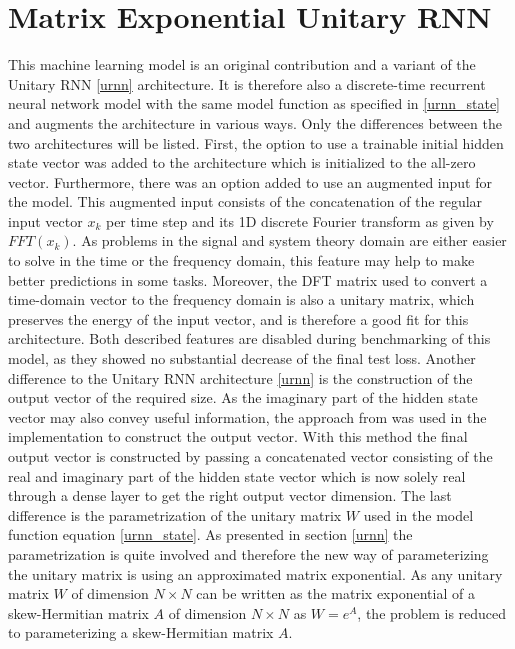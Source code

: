 \documentclass[draft,final]{vutinfth} %
\begin{document}
    \section{Matrix Exponential Unitary RNN} \label{meurnn}
    This machine learning model is an original contribution and a variant of the Unitary RNN \ref{urnn} architecture.
    It is therefore also a discrete-time recurrent neural network model with the same model function as specified in \ref{urnn_state} and augments the architecture in various ways.
    Only the differences between the two architectures will be listed.
    First, the option to use a trainable initial hidden state vector was added to the architecture which is initialized to the all-zero vector.
    Furthermore, there was an option added to use an augmented input for the model.
    This augmented input consists of the concatenation of the regular input vector $x_k$ per time step and its 1D discrete Fourier transform as given by $FFT(x_k)$.
    As problems in the signal and system theory domain are either easier to solve in the time or the frequency domain, this feature may help to make better predictions in some tasks.
    Moreover, the DFT matrix used to convert a time-domain vector to the frequency domain is also a unitary matrix, which preserves the energy of the input vector, and is therefore a good fit for this architecture.
    Both described features are disabled during benchmarking of this model, as they showed no substantial decrease of the final test loss.
    Another difference to the Unitary RNN architecture \ref{urnn} is the construction of the output vector of the required size.
    As the imaginary part of the hidden state vector may also convey useful information, the approach from \cite[p. 4]{UnitaryRNNs} was used in the implementation to construct the output vector.
    With this method the final output vector is constructed by passing a concatenated vector consisting of the real and imaginary part of the hidden state vector which is now solely real through a dense layer to get the right output vector dimension.
    The last difference is the parametrization of the unitary matrix $W$ used in the model function equation \ref{urnn_state}.
    As presented in section \ref{urnn} the parametrization is quite involved and therefore the new way of parameterizing the unitary matrix is using an approximated matrix exponential.
    As any unitary matrix $W$ of dimension $N \times N$ can be written as the matrix exponential of a skew-Hermitian matrix $A$ of dimension $N \times N$ as $W=e^A$, the problem is reduced to parameterizing a skew-Hermitian matrix $A$.
\end{document}
